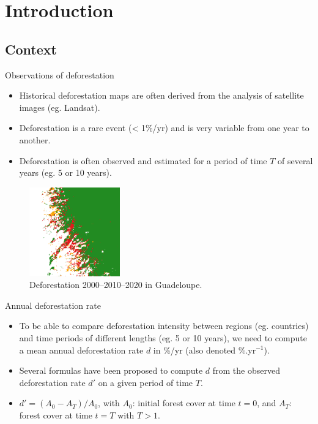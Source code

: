\documentclass[10pt,table,dvipsnames,compress]{beamer}
\begin{document}
\section{Introduction}
\label{sec:org18165b7}

\subsection{Context}
\label{sec:org6d56366}

\begin{frame}[label={sec:org0c03390}]{Observations of deforestation}
\begin{itemize}
\item Historical deforestation maps are often derived from the analysis of satellite images (eg. Landsat).
\item Deforestation is a rare event (< 1\%/yr) and is very variable from one year to another.
\item Deforestation is often observed and estimated for a period of time \(T\) of several years (eg. 5 or 10 years).
\end{itemize}

\begin{figure}[htbp]
\centering
\includegraphics[width=0.35\textwidth]{figs/fcc123_zoom.png}
\caption{Deforestation 2000--2010--2020 in Guadeloupe.}
\end{figure}
\end{frame}

\begin{frame}[label={sec:orgf91b3f4}]{Annual deforestation rate}
\begin{itemize}
\item To be able to compare deforestation intensity between regions (eg. countries) and time periods of different lengths (eg. 5 or 10 years), we need to compute a \alert{\alert{mean annual deforestation rate}} \(d\) in \%/yr (also denoted \%.yr\(^{-1}\)).
\item Several formulas have been proposed to compute \(d\) from the observed deforestation rate \(d'\) on a given period of time \(T\).
\item \(d' = (A_0-A_T)/A_0\), with \(A_0\): initial forest cover at time \(t=0\), and \(A_T\): forest cover at time \(t=T\) with \(T > 1\).
\end{itemize}
\end{frame}
\end{document}
